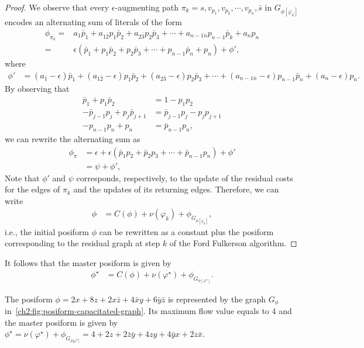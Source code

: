 \begin{proof}

We observe that every $\epsilon$-augmenting path $\pi_k = s,v_{p_1},v_{p_2},\cdots,v_{p_n},\bar{s}$ in $G_{\phi [\varphi_k]}$ encodes an alternating sum of literals of the form
\begin{align*}
	\phi_{\pi_k} =& a_1\bar{p}_1 + a_{1\bar{2}}p_1\bar{p}_2 + a_{2\bar{3}}p_2\bar{p}_3 + \cdots + a_{n-1\bar{n}}p_{n-1}\bar{p}_k + a_np_n \\
	=&\epsilon( \bar{p}_1 + p_1\bar{p}_2 + p_2\bar{p}_3 + \cdots + p_{n-1}\bar{p}_n + p_n ) + \phi ',
\end{align*}
%
where
\begin{align*}
	\phi ' &= (a_{\bar{1}}-\epsilon)\bar{p}_1 + (a_{1\bar{2}} - \epsilon) p_1\bar{p}_2 + (a_{2\bar{3}}  - \epsilon)p_2\bar{p}_3 + \cdots + (a_{n-1\bar{n}} - \epsilon)p_{n-1}\bar{p}_n + (a_n -\epsilon)p_n.
\end{align*}
%
By observing that
\begin{align*}
	\bar{p}_1 + p_1\bar{p}_2 &= 1 - p_1p_2 \\
	-\bar{p}_{j-1}p_{j} + p_j\bar{p}_{j+1} &= \bar{p}_{j-1}p_j - p_jp_{j+1} \\
	-p_{n-1}p_n + p_n &= \bar{p}_{n-1}p_n,
\end{align*}
%
we can rewrite the alternating sum as
\begin{align*}
	\phi_{\pi} &= \epsilon + \epsilon( \bar{p}_1p_2 + \bar{p}_2p_3 + \cdots + \bar{p}_{n-1}p_n ) + \phi ' \\
	&= \psi + \phi ',	
\end{align*}
%
Note that $\phi '$ and $\psi$ corresponds, respectively, to the update of the residual costs for the edges of $\pi_k$ and the updates of its returning edges. Therefore, we can write
\begin{align*}
	\phi &= C(\phi) + \nu(\varphi_k) + \phi_{ G_{ \phi [\varphi_k] }},
\end{align*}
%
i.e., the initial posiform $\phi$ can be rewritten as a constant plus the posiform corresponding to the residual graph at step $k$ of  the Ford Fulkerson algorithm. 
\end{proof}
%
It follows that the master posiform is given by
\begin{align*}
	\phi^{\star} &= C(\phi) + \nu(\varphi^{\star}) + \phi_{ G_{ \phi [ \varphi^{\star}] }}.
\end{align*}
%
\begin{example}
The posiform $\phi = 2x + 8z + 2x\bar{z} + 4\bar{x}y + 6\bar{y}\bar{z}$ is represented by the graph $G_{\phi}$ in~\cref{ch2:fig:posiform-capacitated-graph}. Its maximum flow value  equals to $4$ and the master posiform is given by $\phi^{\star} = \nu(\varphi ^{\star}) + \phi_{G_{\phi {[\varphi^{\star}}]}} = 4 + 2z + 2\bar{z}\bar{y} + 4zy + 4\bar{y}x + 2z\bar{x}$.
\end{example}
